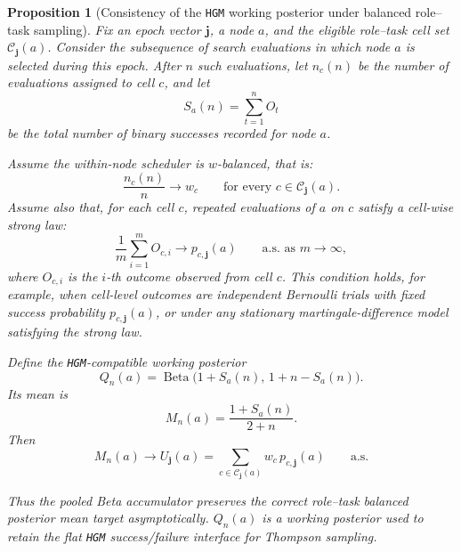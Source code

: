 \documentclass{paper}
\newtheorem{proposition}{Proposition}
\newcommand{\hgm}{\texttt{HGM}\xspace}
\begin{document}
\begin{proposition}[Consistency of the \hgm working posterior under balanced role--task sampling]
\label{prop:balanced-working-posterior}
Fix an epoch vector \(\boldsymbol{j}\), a node \(a\), and the eligible role--task cell set
\(\mathcal C_{\boldsymbol{j}}(a)\). Consider the subsequence of search evaluations in which
node \(a\) is selected during this epoch. After \(n\) such evaluations, let
\(n_c(n)\) be the number of evaluations assigned to cell \(c\), and let
\[
S_a(n)=\sum_{t=1}^{n} O_t
\]
be the total number of binary successes recorded for node \(a\).

Assume the within-node scheduler is \(w\)-balanced, that is:
\[
\frac{n_c(n)}{n}\longrightarrow w_c
\qquad\text{for every } c\in \mathcal C_{\boldsymbol{j}}(a).
\]
Assume also that, for each cell \(c\), repeated evaluations of \(a\) on \(c\)
satisfy a cell-wise strong law:
\[
\frac{1}{m}\sum_{i=1}^{m} O_{c,i}
\longrightarrow
p_{c,\boldsymbol{j}}(a)
\qquad\text{a.s. as }m\to\infty,
\]
where \(O_{c,i}\) is the \(i\)-th outcome observed from cell \(c\). This condition
holds, for example, when cell-level outcomes are independent Bernoulli trials
with fixed success probability \(p_{c,\boldsymbol{j}}(a)\), or under any stationary
martingale-difference model satisfying the strong law.

Define the \hgm-compatible working posterior
\[
Q_n(a)
=
\operatorname{Beta}\bigl(1+S_a(n),\,1+n-S_a(n)\bigr).
\]
Its mean is
\[
M_n(a)
=
\frac{1+S_a(n)}{2+n}.
\]
Then
\[
M_n(a)
\longrightarrow
U_{\boldsymbol{j}}(a)
=
\sum_{c\in \mathcal C_{\boldsymbol{j}}(a)} w_c\,p_{c,\boldsymbol{j}}(a)
\qquad\text{a.s.}
\]

Thus the pooled Beta accumulator preserves the correct role--task balanced
posterior mean target asymptotically. \(Q_n(a)\) is a working posterior used to retain the flat \hgm success/failure interface for Thompson sampling.
\end{proposition}
\end{document}
